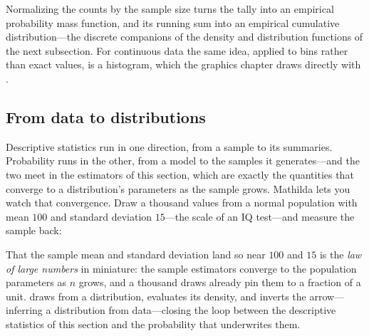 Normalizing the counts by the sample size turns the tally into an empirical
probability mass function, and its running sum into an empirical cumulative
distribution---the discrete companions of the density and distribution functions
of the next subsection. For continuous data the same idea, applied to bins rather
than exact values, is a histogram, which the graphics chapter draws directly with
.

\subsection{From data to distributions}
\label{ssec:stat-distributions}

Descriptive statistics run in one direction, from a sample to its summaries.
Probability runs in the other, from a model to the samples it generates---and the
two meet in the estimators of this section, which are exactly the quantities that
converge to a distribution's parameters as the sample grows. Mathilda lets you
watch that convergence. Draw a thousand values from a normal population with mean
\(100\) and standard deviation \(15\)---the scale of an IQ test---and measure the
sample back:

\begin{codepairs}
\end{codepairs}

That the sample mean and standard deviation land so near \(100\) and \(15\) is the
\emph{law of large numbers} in miniature: the sample
estimators converge to the population parameters as \(n\) grows, and a thousand
draws already pin them to a fraction of a unit.  draws from a
distribution,  evaluates its density, and  inverts the
arrow---inferring a distribution from data---closing the loop between the
descriptive statistics of this section and the probability that underwrites them.

